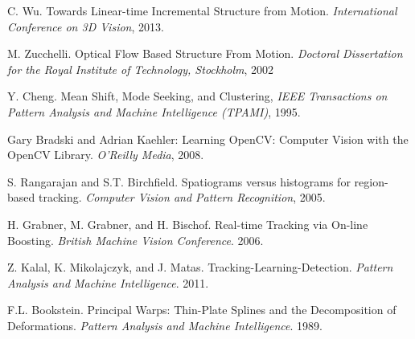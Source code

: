 \begin{thebibliography}{99}
C. Wu. Towards Linear-time Incremental Structure from Motion. {\it International Conference on 3D Vision}, 2013.

M. Zucchelli. Optical Flow Based Structure From Motion. {\it Doctoral Dissertation for the Royal Institute of Technology, Stockholm}, 2002

Y. Cheng. Mean Shift, Mode Seeking, and Clustering, {\it IEEE Transactions on Pattern Analysis and Machine Intelligence (TPAMI)}, 1995.

Gary Bradski and Adrian Kaehler: Learning OpenCV: Computer Vision with the OpenCV Library. {\it  O'Reilly Media}, 2008.

S. Rangarajan and S.T. Birchfield. Spatiograms versus histograms for region-based tracking. {\it Computer Vision and Pattern Recognition}, 2005.

H. Grabner, M. Grabner, and H. Bischof. Real-time Tracking via On-line Boosting. {\it British Machine Vision Conference}. 2006.

Z. Kalal, K. Mikolajczyk, and J. Matas. Tracking-Learning-Detection. {\it Pattern Analysis and Machine Intelligence}. 2011.

F.L. Bookstein. Principal Warps: Thin-Plate Splines and the Decomposition of Deformations. {\it Pattern Analysis and Machine Intelligence}. 1989.


\end{thebibliography}
